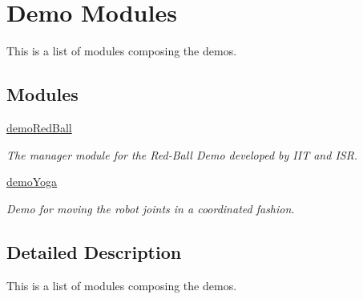 \section{Demo Modules}
\label{group__demo__modules}


This is a list of modules composing the demos.  


\subsection*{Modules}
\begin{DoxyCompactItemize}
\item 
\hyperlink{group__src__demoRedBall}{demo\+Red\+Ball}
\begin{DoxyCompactList}\small\item\em The manager module for the Red-\/\+Ball Demo developed by I\+IT and I\+SR. \end{DoxyCompactList}\item 
\hyperlink{group__src__demoYoga}{demo\+Yoga}
\begin{DoxyCompactList}\small\item\em Demo for moving the robot joints in a coordinated fashion. \end{DoxyCompactList}\end{DoxyCompactItemize}


\subsection{Detailed Description}
This is a list of modules composing the demos. 

